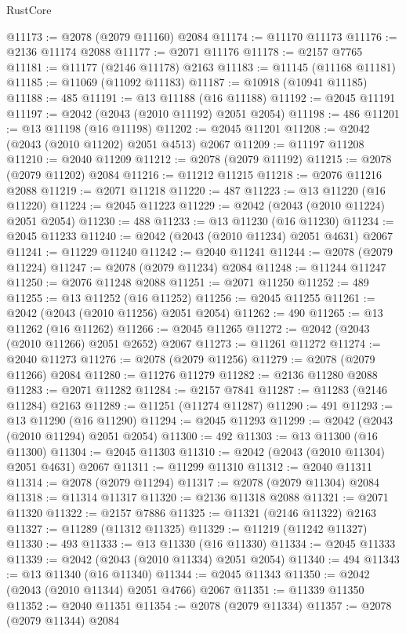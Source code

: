 \begin{lexlean}{RustCore}
\begin{coremodule}
@11173 := @2078 (@2079 @11160) @2084
@11174 := @11170 @11173
@11176 := @2136 @11174 @2088
@11177 := @2071 @11176
@11178 := @2157 @7765
@11181 := @11177 (@2146 @11178) @2163
@11183 := @11145 (@11168 @11181)
@11185 := @11069 (@11092 @11183)
@11187 := @10918 (@10941 @11185)
@11188 := 485
@11191 := @13 @11188 (@16 @11188)
@11192 := @2045 @11191
@11197 := @2042 (@2043 (@2010 @11192) @2051 @2054)
@11198 := 486
@11201 := @13 @11198 (@16 @11198)
@11202 := @2045 @11201
@11208 := @2042 (@2043 (@2010 @11202) @2051 @4513) @2067
@11209 := @11197 @11208
@11210 := @2040 @11209
@11212 := @2078 (@2079 @11192)
@11215 := @2078 (@2079 @11202) @2084
@11216 := @11212 @11215
@11218 := @2076 @11216 @2088
@11219 := @2071 @11218
@11220 := 487
@11223 := @13 @11220 (@16 @11220)
@11224 := @2045 @11223
@11229 := @2042 (@2043 (@2010 @11224) @2051 @2054)
@11230 := 488
@11233 := @13 @11230 (@16 @11230)
@11234 := @2045 @11233
@11240 := @2042 (@2043 (@2010 @11234) @2051 @4631) @2067
@11241 := @11229 @11240
@11242 := @2040 @11241
@11244 := @2078 (@2079 @11224)
@11247 := @2078 (@2079 @11234) @2084
@11248 := @11244 @11247
@11250 := @2076 @11248 @2088
@11251 := @2071 @11250
@11252 := 489
@11255 := @13 @11252 (@16 @11252)
@11256 := @2045 @11255
@11261 := @2042 (@2043 (@2010 @11256) @2051 @2054)
@11262 := 490
@11265 := @13 @11262 (@16 @11262)
@11266 := @2045 @11265
@11272 := @2042 (@2043 (@2010 @11266) @2051 @2652) @2067
@11273 := @11261 @11272
@11274 := @2040 @11273
@11276 := @2078 (@2079 @11256)
@11279 := @2078 (@2079 @11266) @2084
@11280 := @11276 @11279
@11282 := @2136 @11280 @2088
@11283 := @2071 @11282
@11284 := @2157 @7841
@11287 := @11283 (@2146 @11284) @2163
@11289 := @11251 (@11274 @11287)
@11290 := 491
@11293 := @13 @11290 (@16 @11290)
@11294 := @2045 @11293
@11299 := @2042 (@2043 (@2010 @11294) @2051 @2054)
@11300 := 492
@11303 := @13 @11300 (@16 @11300)
@11304 := @2045 @11303
@11310 := @2042 (@2043 (@2010 @11304) @2051 @4631) @2067
@11311 := @11299 @11310
@11312 := @2040 @11311
@11314 := @2078 (@2079 @11294)
@11317 := @2078 (@2079 @11304) @2084
@11318 := @11314 @11317
@11320 := @2136 @11318 @2088
@11321 := @2071 @11320
@11322 := @2157 @7886
@11325 := @11321 (@2146 @11322) @2163
@11327 := @11289 (@11312 @11325)
@11329 := @11219 (@11242 @11327)
@11330 := 493
@11333 := @13 @11330 (@16 @11330)
@11334 := @2045 @11333
@11339 := @2042 (@2043 (@2010 @11334) @2051 @2054)
@11340 := 494
@11343 := @13 @11340 (@16 @11340)
@11344 := @2045 @11343
@11350 := @2042 (@2043 (@2010 @11344) @2051 @4766) @2067
@11351 := @11339 @11350
@11352 := @2040 @11351
@11354 := @2078 (@2079 @11334)
@11357 := @2078 (@2079 @11344) @2084

\end{coremodule}
\end{lexlean}
